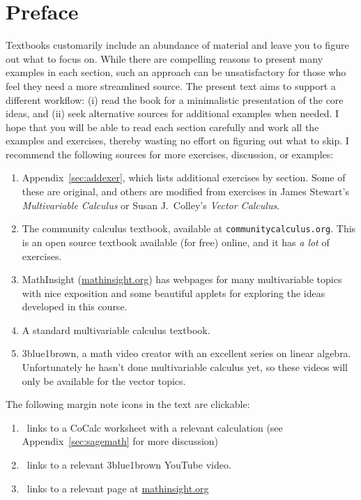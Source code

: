 \documentclass{watsonbook}
\begin{document}

\newpage 
\pagecolor{white} 
\hphantom{a} \thispagestyle{empty} 
\newpage

\chapter*{Preface} \thispagestyle{empty} 

Textbooks customarily include an abundance of material and leave you
to figure out what to focus on. While there are compelling reasons to
present many examples in each section, such an approach can be
unsatisfactory for those who feel they need a more streamlined
source. The present text aims to support a different workflow: (i)
read the book for a minimalistic presentation of the core ideas, and
(ii) seek alternative sources for additional examples when needed. I
hope that you will be able to read each section carefully and work all
the examples and exercises, thereby wasting no effort on figuring out
what to skip. I recommend the following sources for more exercises,
discussion, or examples:
\begin{enumerate}[itemsep = 3pt]
\item Appendix~\ref{sec:addexer}, which lists additional exercises by
  section. Some of these are original, and others are
  modified from exercises in 
  James Stewart's \textit{Multivariable Calculus} or Susan J.\ Colley's \textit{Vector
    Calculus}. 
\item The community calculus textbook, available at
  \texttt{communitycalculus.org}. This is an open source textbook available (for
  free) online, and it has \textit{a lot} of exercises. 
\item MathInsight (\url{mathinsight.org}) has webpages for many
  multivariable topics with nice exposition and some beautiful applets for exploring the
  ideas developed in this course. 
\item A standard multivariable calculus textbook.  
\item 3blue1brown, a math video creator with an excellent series on
  linear algebra. Unfortunately he hasn't done multivariable calculus
  yet, so these videos will only be available for the vector topics. 
\end{enumerate}

The following margin note icons in the text are clickable:
\begin{enumerate}[itemsep=6pt, topsep = -6pt]
\item \href{http://cocalc.com}{\cocalc}\,
  links to a CoCalc worksheet with a relevant calculation (see Appendix~\ref{sec:sagemath} for more
  discussion)
\item \href{http://3blue1brown.com}{\tbob} \, links to a relevant 3blue1brown YouTube video.
\item \href{http://mathinsight.org}{\mi} \, links to a relevant page at \url{mathinsight.org}
\end{enumerate}
\end{document}
